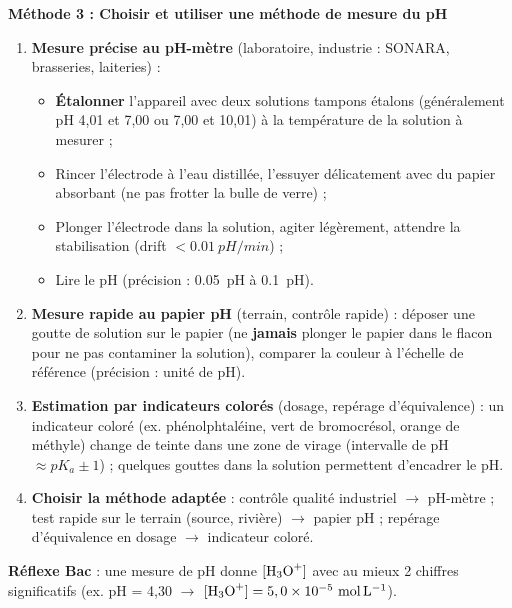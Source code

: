 \documentclass[11pt]{article}
\newcommand{\cle}[1]{{\popxbold\color{popdark}#1}}
\begin{document}
\textbf{Méthode 3 : Choisir et utiliser une méthode de mesure du pH}\par
\begin{methode}
\begin{enumerate}
\item \textbf{Mesure précise au pH-mètre} (laboratoire, industrie : SONARA, brasseries, laiteries) :
\begin{itemize}
\item \textbf{Étalonner} l'appareil avec deux solutions tampons étalons (généralement pH 4,01 et 7,00 ou 7,00 et 10,01) à la température de la solution à mesurer ;
\item Rincer l'électrode à l'eau distillée, l'essuyer délicatement avec du papier absorbant (ne pas frotter la bulle de verre) ;
\item Plonger l'électrode dans la solution, agiter légèrement, attendre la stabilisation (drift $< \SI{0,01}{pH/min}$) ;
\item Lire le pH (précision : \SI{0,05}{pH} à \SI{0,1}{pH}).
\end{itemize}
\item \textbf{Mesure rapide au papier pH} (terrain, contrôle rapide) : déposer une goutte de solution sur le papier (ne \textbf{jamais} plonger le papier dans le flacon pour ne pas contaminer la solution), comparer la couleur à l'échelle de référence (précision :  unité de pH).
\item \textbf{Estimation par indicateurs colorés} (dosage, repérage d'équivalence) : un \cle{indicateur coloré} (ex. phénolphtaléine, vert de bromocrésol, orange de méthyle) change de teinte dans une \cle{zone de virage} (intervalle de pH $\approx pK_a \pm 1$) ; quelques gouttes dans la solution permettent d'encadrer le pH.
\item \textbf{Choisir la méthode adaptée} : contrôle qualité industriel $\to$ pH-mètre ; test rapide sur le terrain (source, rivière) $\to$ papier pH ; repérage d'équivalence en dosage $\to$ indicateur coloré.
\end{enumerate}
\textbf{Réflexe Bac} : une mesure de pH donne $[\ce{H3O+}]$ avec au mieux 2 chiffres significatifs (ex. pH = 4,30 $\to$ $[\ce{H3O+}] = 5,0 \times 10^{-5}\ \si{mol.L^{-1}}$).
\end{methode}
\end{document}
